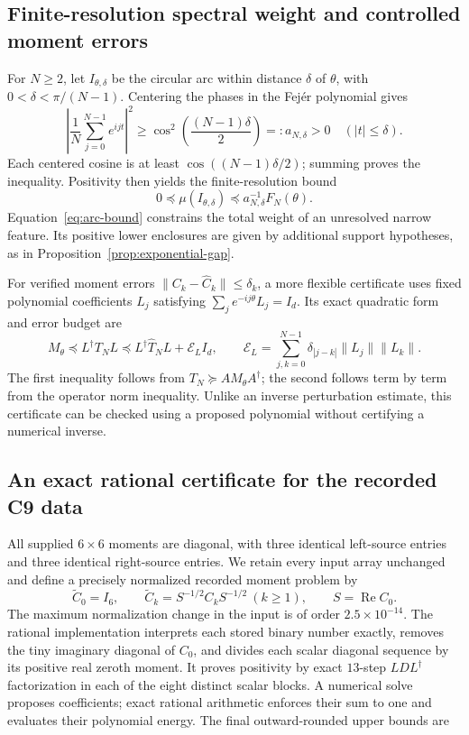 \subsection{Finite-resolution spectral weight and controlled moment errors}
For $N\geq2$, let $I_{\theta,\delta}$ be the circular arc within distance $\delta$ of $\theta$, with $0<\delta<\pi/(N-1)$. Centering the phases in the Fej\'er polynomial gives
\[
\left|\frac1N\sum_{j=0}^{N-1}e^{ijt}\right|^2
\geq\cos^2\!\left(\frac{(N-1)\delta}{2}\right)=:a_{N,\delta}>0
\quad (|t|\leq\delta).
\]
Each centered cosine is at least $\cos((N-1)\delta/2)$; summing proves the inequality. Positivity then yields the finite-resolution bound
\begin{equation}\label{eq:arc-bound}
0\preceq\mu(I_{\theta,\delta})\preceq a_{N,\delta}^{-1}F_N(\theta).
\end{equation}
Equation~\eqref{eq:arc-bound} constrains the total weight of an unresolved narrow feature. Its positive lower enclosures are given by additional support hypotheses, as in Proposition~\ref{prop:exponential-gap}.

For verified moment errors $\|C_k-\widehat C_k\|\leq\delta_k$, a more flexible certificate uses fixed polynomial coefficients $L_j$ satisfying $\sum_j e^{-ij\theta}L_j=I_d$. Its exact quadratic form and error budget are
\begin{equation}\label{eq:polynomial-error}
M_\theta\preceq L^\dagger T_N L
\preceq L^\dagger\widehat T_NL+\mathcal E_LI_d,\qquad
\mathcal E_L=\sum_{j,k=0}^{N-1}\delta_{|j-k|}\|L_j\|\|L_k\|.
\end{equation}
The first inequality follows from $T_N\succeq AM_\theta A^\dagger$; the second follows term by term from the operator norm inequality. Unlike an inverse perturbation estimate, this certificate can be checked using a proposed polynomial without certifying a numerical inverse.

\subsection{An exact rational certificate for the recorded C9 data}
All supplied $6\times6$ moments are diagonal, with three identical left-source entries and three identical right-source entries. We retain every input array unchanged and define a precisely normalized recorded moment problem by
\[
\widetilde C_0=I_6,\qquad
\widetilde C_k=S^{-1/2}C_kS^{-1/2}\ (k\geq1),\qquad
S=\operatorname{Re}C_0.
\]
The maximum normalization change in the input is of order $2.5\times10^{-14}$. The rational implementation interprets each stored binary number exactly, removes the tiny imaginary diagonal of $C_0$, and divides each scalar diagonal sequence by its positive real zeroth moment. It proves positivity by exact $13$-step $LDL^\dagger$ factorization in each of the eight distinct scalar blocks. A numerical solve proposes coefficients; exact rational arithmetic enforces their sum to one and evaluates their polynomial energy. The final outward-rounded upper bounds are


